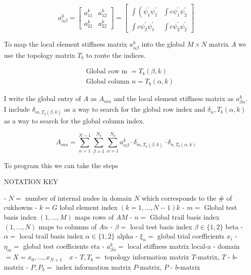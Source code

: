 \documentclass[12pt, oneside]{book}
\begin{document}
$$
a_{\alpha \beta}^{k}=\left[\begin{array}{cc}
a_{11}^{k} & a_{12}^{k} \\
a_{21}^{k} & a_{22}^{k}
\end{array}\right]=\left[\begin{array}{ll}
\int\left(\psi_{1}^{\prime} \psi_{1}^{\prime}\right. & \int c \psi_{1}^{\prime} \psi_{2}^{\prime} \\
\int c \psi_{2}^{\prime} \psi_{1}^{\prime} & \int c \psi_{2}^{\prime} \psi_{2}^{\prime}
\end{array}\right]
$$

To map the local element stiffness matrix $a_{\alpha \beta}^{k}$ into the global $M \times N$ matrix $A$ we use the topology matrix $T_{b}$ to route the indices.

$$
\begin{aligned}
& \text { Global cow m }=T_{b}(\beta, k) \\
& \text { Global column } n=T_{b}(\alpha, k)
\end{aligned}
$$

I write the global entry of $A$ as $A_{m n}$ and the local element stiffness matrix as $a_{\beta \alpha}^{k}$. I include $\delta_{m, T_{b}(\beta, k)}$ as a way to search for the global row index and $\delta_{n}, T_{b}(\alpha, k)$ as a way to search for the global column index.

$$
A_{m n}=\sum_{n=1}^{N-1} \sum_{\beta=1}^{N_{b}} \sum_{\alpha=1}^{N_{b}} a_{\alpha \beta}^{k} \cdot \delta_{m, T_{b}(\beta, k)} \cdot \delta_{n, T_{b}(\alpha, k)}
$$

To program this we can take the steps

NOTATION KEY

- $N=$ number of internal nudes in domain $N$ which corresponds to the \# of cukhowns
- $k=G$ lobal element index $(k=1, \ldots, N-1) k$
- $m=$ Global test basis index $(1, \ldots, M)$ maps rows of $A M$
- $n=$ Global trail basis index $(1, \ldots, N)$ maps to columns of $A n$
- $\beta=$ local test basis index $\beta \in\{1,2\}$ beta
- $\alpha=$ local trail basis index $\alpha \in\{1,2\}$ alpha
- $\xi_{n}=$ global trial coefficients $x_{i}$
- $\eta_{m}=$ global test coefficients eta
- $a_{\beta \alpha}^{k}=$ local stiffness matrix local-a
- domain $=X=x_{0}, \ldots, x_{N+1} \quad x$
- $T, T_{b}=$ topology information matrix $T$-matrix, $T$ - $b$-matrix
- $P, P_{b}=$ index information matrix $P$-matrix, $P$ - $b$-matrix
\end{document}
